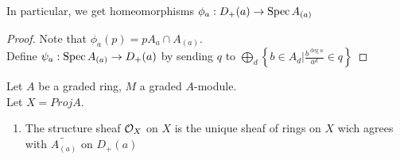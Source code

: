 \documentclass[../main.tex]{subfiles}
\begin{document}
In particular, we get homeomorphisms $\phi_a: D_+( a) \to \operatorname{Spec} A_{(a) } $ 
\begin{proof}
Note that $\phi_a( p) = p A_a \cap A_{( a) } $.\\
Define $\psi_a: \operatorname{Spec} A_{( a) } \to D_+( a) $ by sending $q$ to $\bigoplus_{d} \left\{ b \in A_d | \frac{b^{\deg a}}{a^{d}} \in q \right\} $ 
\end{proof}
\begin{defn}
	Let $A$ be a graded ring, $M$ a graded $A$-module.\\
	Let $X= Proj A$.
	\begin{enumerate}
		\item The structure sheaf $\mathcal{O}_X$ on $X$ is the unique sheaf of rings on $X$ wich agrees with $\widetilde{A_{( a) } }$ on $D_+( a) $ 
	\end{enumerate}
	
\end{defn}
\end{document}
